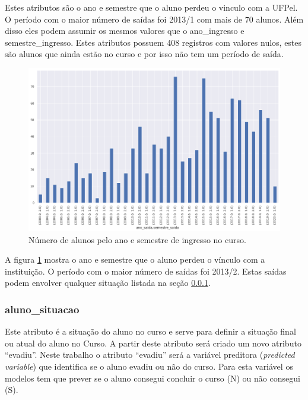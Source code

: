 \documentclass[diss,capa]{texufpel}
\begin{document}
Estes atributos são o ano e semestre que o aluno perdeu o vinculo com a UFPel.
O período com o maior número de saídas foi 2013/1 com mais de 70 alunos.
Além disso eles podem assumir os mesmos valores que o ano\_ingresso e semestre\_ingresso.
Estes atributos possuem 408 registros com valores nulos, estes são alunos que ainda estão no curso e por isso não tem um período de saída.

\begin{figure}[htbp]
\centering \includegraphics[scale=.41]{imagens/nr-alunos-pelo-ano-semestre-saida.png}
\caption{Número de alunos pelo ano e semestre de ingresso no curso.}
\label{fig:nr-alunos-pelo-ano-semestre-saida}
\end{figure}

A figura \ref{fig:nr-alunos-pelo-ano-semestre-saida} mostra o ano e semestre que o aluno perdeu o vínculo com a instituição. O período com o maior número de saídas foi 2013/2. Estas saídas podem envolver qualquer situação listada na seção \ref{subsubsec:aluno-situacao}.

\subsubsection{aluno\_situacao}
\label{subsubsec:aluno-situacao}

Este atributo é a situação do aluno no curso e serve para definir a situação final ou atual do aluno no Curso. A partir deste atributo será criado um novo atributo ``evadiu''. Neste trabalho o atributo ``evadiu'' será a variável preditora (\textit{predicted variable}) que identifica se o aluno evadiu ou não do curso.
Para esta variável os modelos tem que prever se o aluno consegui concluir o curso (N) ou não consegui (S).
\end{document}
